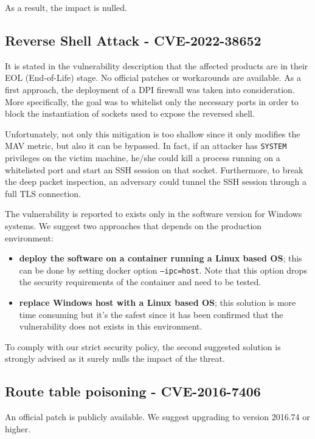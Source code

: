As a result, the impact is nulled.

\subsection*{Reverse Shell Attack - CVE-2022-38652}

It is stated in the vulnerability description that the affected products are in their EOL (End-of-Life) stage. No official patches or workarounds are available. As a first approach, the deployment of a DPI firewall was taken into consideration. More specifically, the goal was to whitelist only the necessary ports in order to block the instantiation of sockets used to expose the reversed shell. 

Unfortunately, not only this mitigation is too shallow since it only modifies the MAV metric, but also it can be bypassed. In fact, if an attacker has \texttt{SYSTEM} privileges on the victim machine, he/she could kill a process running on a whitelisted port and start an SSH session on that socket. Furthermore, to break the deep packet inspection, an adversary could tunnel the SSH session through a full TLS connection.\cite{online:SSH-TLS}

The vulnerability is reported to exists only in the software version for Windows systems. We suggest two approaches that depends on the production environment:

\begin{itemize}
    \item \textbf{deploy the software on a container running a Linux based OS}; this can be done by setting docker option \texttt{--ipc=host}. Note that this option drops the security requirements of the container and need to be tested.
    \item \textbf{replace Windows host with a Linux based OS}; this solution is more time consuming but it's the safest since it has been confirmed that the vulnerability does not exists in this environment.
\end{itemize}

To comply with our strict security policy, the second suggested solution is strongly advised as it surely nulls the impact of the threat.

\subsection*{Route table poisoning - CVE-2016-7406}

An official patch is publicly available. We suggest upgrading to version 2016.74 or higher.\cite{online:mitigation-cve-2016-7406}
